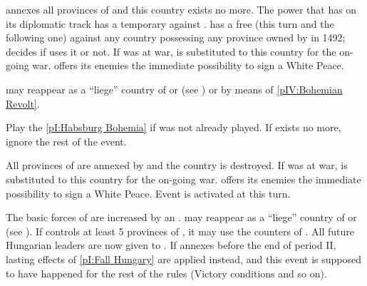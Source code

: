 


\phevnt
\aparag \HAB annexes all provinces of \paysBoheme and this country exists no
more.  The power that has \paysBoheme on its diplomatic track has a temporary
\CB against \HAB.
\aparag \HAB has a free \CB (this turn and the following one) against any
country possessing any province owned by \paysBoheme in 1492; \SPA decides if
\HAB uses it or not.
\aparag If \paysBoheme was at war, \HAB is substituted to this country for the
on-going war. \HAB offers its enemies the immediate possibility to sign a
White Peace.

\effetlong
\aparag \paysBoheme may reappear as a ``liege'' country of \HAB or \SPA (see
) or by means of \ref{pIV:Bohemian
  Revolt}.






\condition{}
\aparag Play the \ref{pI:Habsburg Bohemia} if was not already played.
\aparag If \paysHongrie exists no more, ignore the rest of the event.

\phevnt
\aparag All provinces of \paysHongrie are annexed by \HAB and the country is
destroyed.
\aparag If \paysHongrie was at war, \HAB is substituted to this country for
the on-going war. \HAB offers its enemies the immediate possibility to sign a
White Peace.
\aparag Event  is activated at this turn.

\effetlong
\aparag The basic forces of \HAB are increased by an \ARMY\faceplus.
\aparag \paysHongrie may reappear as a ``liege'' country of \HAB or \SPA (see
).
\aparag If \HAB controls at least 5 provinces of \paysHongrie, it may use the
counters of \paysHongrie.
\aparag All future Hungarian leaders are now given to \HAB.
\aparag If \TUR annexes \villeBuda before the end of period II, lasting
effects of \ref{pI:Fall Hungary} are applied instead, and this event is
supposed to have happened for the rest of the rules (Victory conditions and so
on).



